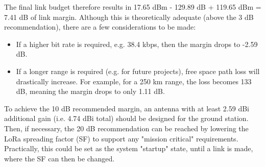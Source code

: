 The final link budget therefore results in 17.65 dBm - 129.89 dB + 119.65 dBm = 7.41 dB of link margin. Although this is theoretically adequate (above the 3 dB recommendation), there are a few considerations to be made:
\begin{itemize}
    \item If a higher bit rate is required, e.g. 38.4 kbps, then the margin drops to -2.59 dB.
    \item If a longer range is required (e.g. for future projects), free space path loss will drastically increase. For example, for a 250 km range, the loss becomes 133 dB, meaning the margin drops to only 1.11 dB.
\end{itemize}

To achieve the 10 dB recommended margin, an antenna with at least 2.59 dBi additional gain (i.e. 4.74 dBi total) should be designed for the ground station. Then, if necessary, the 20 dB recommendation can be reached by lowering the LoRa spreading factor (SF) to support any "mission critical" requirements. Practically, this could be set as the system "startup" state, until a link is made, where the SF can then be changed.